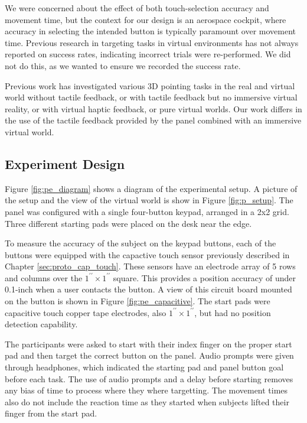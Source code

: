 We were concerned about the effect of both touch-selection accuracy and movement time, but the context for our design is an aerospace cockpit, where accuracy in selecting the intended button is typically paramount over movement time.
Previous research in targeting tasks in virtual environments has not always reported on success rates, indicating incorrect trials were re-performed.
We did not do this, as we wanted to ensure we recorded the success rate.

Previous work has investigated various 3D pointing tasks in the real and virtual world without tactile feedback\cite{liu_comparing_2009}, or with tactile feedback but no immersive virtual reality\cite{teather_evaluating_2010}, or with virtual haptic feedback\cite{chun_evaluating_2004}, or pure virtual worlds\cite{bruder_touch_2013,grossman_pointing_2004}.
Our work differs in the use of the tactile feedback provided by the panel combined with an immersive virtual world.

\subsection{Experiment Design}

Figure \ref{fig:pe_diagram} shows a diagram of the experimental setup.
A picture of the setup and the view of the virtual world is show in Figure \ref{fig:p_setup}.
The panel was configured with a single four-button keypad, arranged in a 2x2 grid.
Three different starting pads were placed on the desk near the edge.

To measure the accuracy of the subject on the keypad buttons, each of the buttons were equipped with the capactive touch sensor previously described in Chapter \ref{sec:proto_cap_touch}.
These sensors have an electrode array of 5 rows and columns over the $1^{\prime\prime} \times 1^{\prime\prime}$ square.
This provides a position accuracy of under 0.1-inch when a user contacts the button.
A view of this circuit board mounted on the button is shown in Figure \ref{fig:pe_capacitive}.
The start pads were capacitive touch copper tape electrodes, also $1^{\prime\prime} \times 1^{\prime\prime}$, but had no position detection capability.

The participants were asked to start with their index finger on the proper start pad and then target the correct button on the panel.
Audio prompts were given through headphones, which indicated the starting pad and panel button goal before each task.
The use of audio prompts and a delay before starting removes any bias of time to process where they where targetting.
The movement times also do not include the reaction time as they started when subjects lifted their finger from the start pad.


